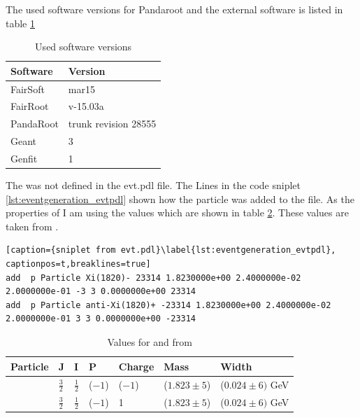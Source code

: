 The used software versions for Pandaroot and the external software is listed in table \ref{tab:eventgeneration_software} 

\begin{table}[htb]
	\centering
	\caption{Used software versions}
	\label{tab:eventgeneration_software}
	\begin{tabular}{ll}
		\hline
		Software & Version \\
		\hline
		\hline
		FairSoft & mar15\\
		FairRoot & v-15.03a \\
		PandaRoot & trunk revision 28555 \\
		Geant & 3\\
		Genfit & 1\\\hline
			 
	\end{tabular}
\end{table}


The \excitedcascade was not defined in the evt.pdl file. 
The Lines in the code sniplet \ref{lst:eventgeneration_evtpdl} shown how the particle was added to the file.
As the properties of \excitedcascade I am using the values which are shown in table \ref{tab:eventgeneration_Xivalues}.
These values are taken from \cite{PDG}.

\begin{lstlisting}[caption={sniplet from evt.pdl}\label{lst:eventgeneration_evtpdl}, captionpos=t,breaklines=true]
add  p Particle Xi(1820)- 23314 1.8230000e+00 2.4000000e-02 2.0000000e-01 -3 3 0.0000000e+00 23314
add  p Particle anti-Xi(1820)+ -23314 1.8230000e+00 2.4000000e-02 2.0000000e-01 3 3 0.0000000e+00 -23314
\end{lstlisting}

\begin{table}[tb]
	\centering
	\caption{Values for \excitedcascade and \excitedanticascade from \cite{PDG}}
	\label{tab:eventgeneration_Xivalues}
	\begin{tabular}{lllllll}
		\hline
		Particle & J & I & P & Charge & Mass  & Width \\
		\hline
		\hline
		\excitedcascade & $\frac{3}{2}$ & $\frac{1}{2}$ & ($-1$) & ($-1$) & ($1.823 \pm 5$)\massunit & ($0.024 \pm 6) $ GeV \\
		\excitedanticascade & $\frac{3}{2}$ & $\frac{1}{2}$ & ($-1$) & 1 & ($1.823 \pm 5$)\massunit & ($0.024 \pm 6) $ GeV\\
		\hline
		  
	\end{tabular}
\end{table}

